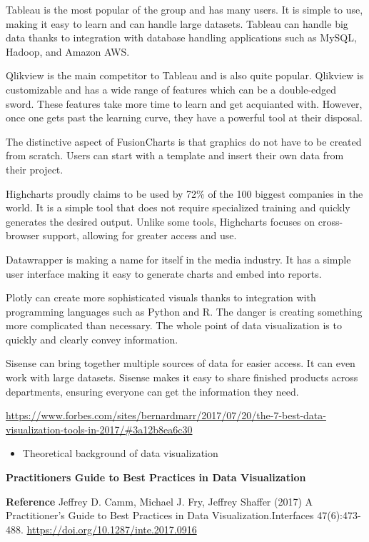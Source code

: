 \documentclass[]{book}
\providecommand{\tightlist}{%
  \setlength{\itemsep}{0pt}\setlength{\parskip}{0pt}}
\theoremstyle{definition}
\theoremstyle{definition}
\theoremstyle{definition}
\theoremstyle{remark}
\begin{document}
Tableau is the most popular of the group and has many users. It is
simple to use, making it easy to learn and can handle large datasets.
Tableau can handle big data thanks to integration with database handling
applications such as MySQL, Hadoop, and Amazon AWS.

Qlikview is the main competitor to Tableau and is also quite popular.
Qlikview is customizable and has a wide range of features which can be a
double-edged sword. These features take more time to learn and get
acquianted with. However, once one gets past the learning curve, they
have a powerful tool at their disposal.

The distinctive aspect of FusionCharts is that graphics do not have to
be created from scratch. Users can start with a template and insert
their own data from their project.

Highcharts proudly claims to be used by 72\% of the 100 biggest
companies in the world. It is a simple tool that does not require
specialized training and quickly generates the desired output. Unlike
some tools, Highcharts focuses on cross-browser support, allowing for
greater access and use.

Datawrapper is making a name for itself in the media industry. It has a
simple user interface making it easy to generate charts and embed into
reports.

Plotly can create more sophisticated visuals thanks to integration with
programming languages such as Python and R. The danger is creating
something more complicated than necessary. The whole point of data
visualization is to quickly and clearly convey information.

Sisense can bring together multiple sources of data for easier access.
It can even work with large datasets. Sisense makes it easy to share
finished products across departments, ensuring everyone can get the
information they need.

\url{https://www.forbes.com/sites/bernardmarr/2017/07/20/the-7-best-data-visualization-tools-in-2017/\#3a12b8ea6c30}

\begin{itemize}
\tightlist
\item
  Theoretical background of data visualization
\end{itemize}

\textbf{Practitioners Guide to Best Practices in Data Visualization}

\textbf{Reference} Jeffrey D. Camm, Michael J. Fry, Jeffrey Shaffer
(2017) A Practitioner's Guide to Best Practices in Data
Visualization.Interfaces 47(6):473-488.
\url{https://doi.org/10.1287/inte.2017.0916}
\end{document}
